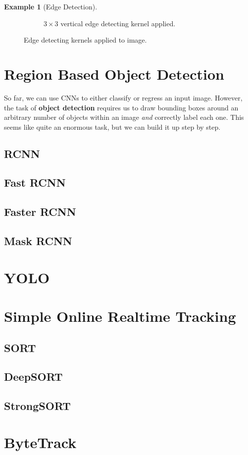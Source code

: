 \documentclass{article}
\theoremstyle{definition}
\newtheorem{example}{Example}[section]
\theoremstyle{remark}
\theoremstyle{definition}
\begin{document}
\begin{example}[Edge Detection]
\begin{figure}[hbt!]
\begin{subfigure}[b]{0.45\textwidth}
        \caption{$3 \times 3$ vertical edge detecting kernel applied. }
        \label{fig:d}
    \end{subfigure}

    \label{fig:cats_histogram}
    \caption{Edge detecting kernels applied to image. }
\end{figure}
\end{example}

\section{Region Based Object Detection}

So far, we can use CNNs to either classify or regress an input image. However, the task of \textbf{object detection} requires us to draw bounding boxes around an arbitrary number of objects within an image \textit{and} correctly label each one. This seems like quite an enormous task, but we can build it up step by step. 

\subsection{RCNN}



\subsection{Fast RCNN}

\subsection{Faster RCNN}

\subsection{Mask RCNN}

\section{YOLO}

\section{Simple Online Realtime Tracking} 

\subsection{SORT}

\subsection{DeepSORT}

\subsection{StrongSORT}

\section{ByteTrack}
\end{document}
